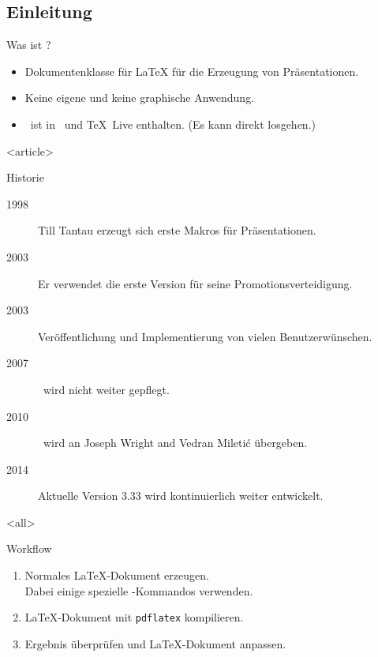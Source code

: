 
\subsection{Einleitung}

\begin{Frame}{Was ist \beamer?}
  \begin{itemize}
    \item \alert{Dokumentenklasse für \LaTeX} für die Erzeugung von Präsentationen.
    \item Keine eigene und \alert{keine graphische Anwendung}.
    \item \strut\beamer\ ist in \MiKTeX\ und \TeX\ Live enthalten.\newline
      (\alert{Es kann direkt losgehen}.)
  \end{itemize}
\end{Frame}

\mode
<article>

\begin{Frame}{Historie}
  \begin{description}
    \item[1998] Till Tantau erzeugt sich erste Makros für Präsentationen.
    \item[2003] Er verwendet die erste Version für seine Promotionsverteidigung.
    \item[2003] Veröffentlichung und Implementierung von vielen Benutzerwünschen.
    \item[2007] \beamer\ wird nicht weiter gepflegt.
    \item[2010] \beamer\ wird an Joseph Wright and Vedran Mileti\'c übergeben.
    \item[2014] Aktuelle Version 3.33 wird kontinuierlich weiter entwickelt.
  \end{description}
\end{Frame}

\mode
<all>

\begin{Frame}{Workflow}
  \begin{enumerate}
    \item Normales \LaTeX-Dokument erzeugen.\\
      Dabei einige spezielle \beamer-Kommandos verwenden.
    \item \LaTeX-Dokument mit \lstinline-pdflatex- kompilieren.
    \item Ergebnis überprüfen und \LaTeX-Dokument anpassen.
  \end{enumerate}
\end{Frame}

